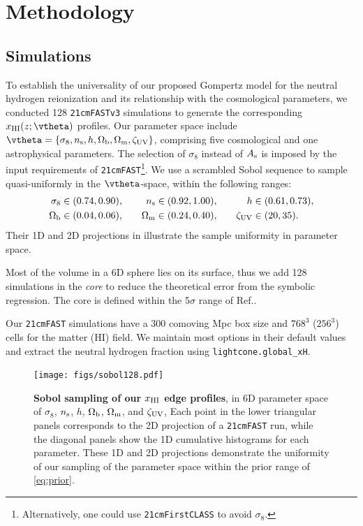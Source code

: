 \section*{Methodology}
\label{sec:methods}


\subsection*{Simulations}
\label{ssec:sims}

To establish the universality of our proposed Gompertz model for the
neutral hydrogen reionization and its relationship with the cosmological
parameters, we conducted 128 \texttt{21cmFASTv3} simulations to generate
the corresponding $x_\HI(z; \vtheta)$ profiles. 
Our parameter space include $\vtheta = \{\sigma_8, \ns, h, \Omegab,
\Omegam, \zetaUV\}$, comprising five cosmological and one astrophysical
parameters.
The selection of $\sigma_8$ instead of $A_\mathrm{s}$ is imposed by the input
requirements of \texttt{21cmFAST}\footnote{Alternatively, one could use
\texttt{21cmFirstCLASS}\cite{Flitter2024} to avoid $\sigma_8$.}.
We use a scrambled Sobol sequence \cite{Sobol1967, Owen1998} to sample
quasi-uniformly in the $\vtheta$-space, within the following ranges:
%
\begin{alignat}{3}
\label{eq:prior}
\sigma_8 &\in (0.74, 0.90), &\quad
n_\mathrm{s} &\in (0.92, 1.00), &\quad
h &\in (0.61, 0.73), \nonumber\\
\Omega_\mathrm{b} &\in (0.04, 0.06), &\quad
\Omega_\mathrm{m} &\in (0.24, 0.40), &\quad
\zeta_\mathrm{UV} &\in (20, 35).
\end{alignat}
%
Their 1D and 2D projections in  illustrate the sample
uniformity in parameter space.

Most of the volume in a 6D sphere lies on its surface, thus we add 128
simulations in the \emph{core} to reduce the theoretical error from the symbolic 
regression. The core is defined within the 5$\sigma$ range of Ref.\cite{Planck2020a}. 

Our \texttt{21cmFAST} simulations have a 300 comoving Mpc box size and
$768^3$ ($256^3$) cells for the matter (HI) field.
We maintain most options in their default values and extract the
neutral hydrogen fraction using \texttt{lightcone.global\_xH}.

\begin{figure}[tb] 
\centering
\texttt{[image: figs/sobol128.pdf]}
\caption{\textbf{Sobol sampling of our $x_{\mathrm{HI}}$ edge profiles}, in 6D
parameter space of $\sigma_8$, $n_\mathrm{s}$, $h$, $\Omega_\mathrm{b}$, $\Omega_\mathrm{m}$, and
$\zeta_\mathrm{UV}$,
Each point in the lower triangular panels corresponds to the 2D
projection of a \texttt{21cmFAST} run, while the diagonal panels show
the 1D cumulative histograms for each parameter.
These 1D and 2D projections demonstrate the uniformity of our sampling
of the parameter space within the prior range of \cref{eq:prior}.}
\label{fig:sobol}
\end{figure}

